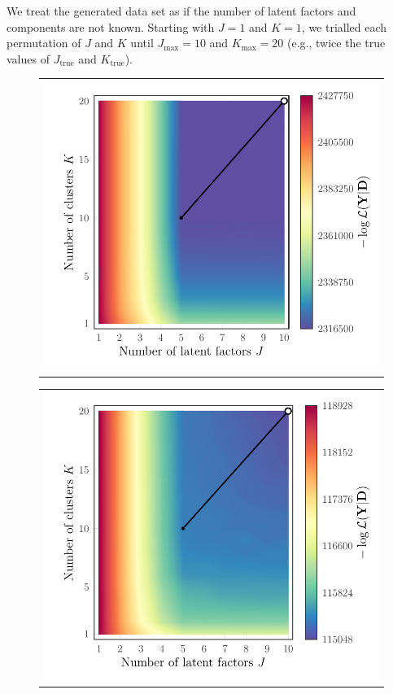 \documentclass[twocolumn]{aastex62}
\newcommand{\NumLatentFactors}{J}
\newcommand{\NumComponents}{K}
\begin{document}
We treat the generated data set as if the number of latent factors
and components are not known. Starting with $\NumLatentFactors = 1$
and $\NumComponents = 1$, we trialled each permutation of $\NumLatentFactors$ and $\NumComponents$
until $\NumLatentFactors_\textrm{max} = 10$
and   $\NumComponents_\textrm{max} = 20$ (e.g., twice the true values of $\NumLatentFactors_\textrm{true}$ and $\NumComponents_\textrm{true}$).



\begin{figure}
	\centering
	\begin{tabular}[b]{@{}p{}@{}}
		\centering\includegraphics[width=\linewidth]{experiments/eval-figs/eval-1-gridsearch-ll-contours.pdf} \\
	\end{tabular}
	\begin{tabular}[b]{@{}p{}@{}}
		\centering\includegraphics[width=\linewidth]{experiments/eval-figs/eval-2-gridsearch-ll-contours.pdf} \\
	\end{tabular}


\end{figure}
\end{document}
